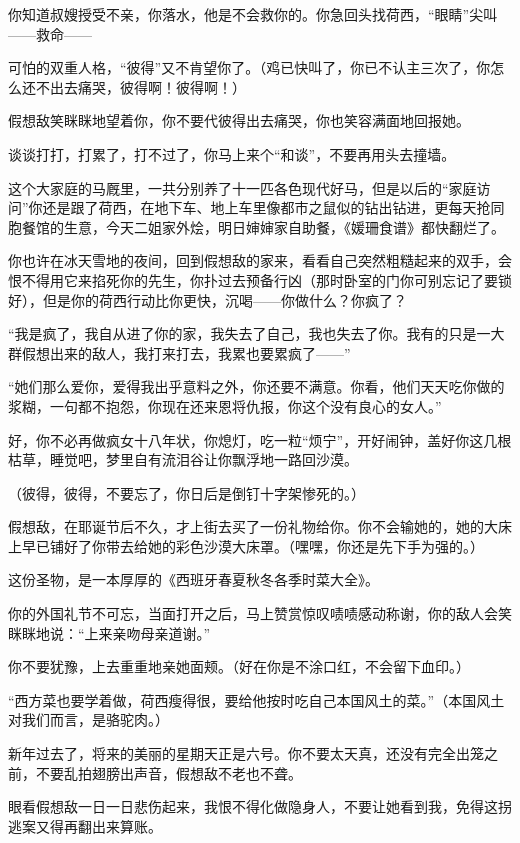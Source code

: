 \par 你知道叔嫂授受不亲，你落水，他是不会救你的。你急回头找荷西，“眼睛”尖叫——救命——
\par 可怕的双重人格，“彼得”又不肯望你了。（鸡已快叫了，你已不认主三次了，你怎么还不出去痛哭，彼得啊！彼得啊！）
\par 假想敌笑眯眯地望着你，你不要代彼得出去痛哭，你也笑容满面地回报她。
\par 谈谈打打，打累了，打不过了，你马上来个“和谈”，不要再用头去撞墙。
\par 这个大家庭的马厩里，一共分别养了十一匹各色现代好马，但是以后的“家庭访问”你还是跟了荷西，在地下车、地上车里像都市之鼠似的钻出钻进，更每天抢同胞餐馆的生意，今天二姐家外烩，明日婶婶家自助餐，《媛珊食谱》都快翻烂了。
\par 你也许在冰天雪地的夜间，回到假想敌的家来，看看自己突然粗糙起来的双手，会恨不得用它来掐死你的先生，你扑过去预备行凶（那时卧室的门你可别忘记了要锁好），但是你的荷西行动比你更快，沉喝——你做什么？你疯了？
\par “我是疯了，我自从进了你的家，我失去了自己，我也失去了你。我有的只是一大群假想出来的敌人，我打来打去，我累也要累疯了——”
\par “她们那么爱你，爱得我出乎意料之外，你还要不满意。你看，他们天天吃你做的浆糊，一句都不抱怨，你现在还来恩将仇报，你这个没有良心的女人。”
\par 好，你不必再做疯女十八年状，你熄灯，吃一粒“烦宁”，开好闹钟，盖好你这几根枯草，睡觉吧，梦里自有流泪谷让你飘浮地一路回沙漠。
\par （彼得，彼得，不要忘了，你日后是倒钉十字架惨死的。）
\par 假想敌，在耶诞节后不久，才上街去买了一份礼物给你。你不会输她的，她的大床上早已铺好了你带去给她的彩色沙漠大床罩。（嘿嘿，你还是先下手为强的。）
\par 这份圣物，是一本厚厚的《西班牙春夏秋冬各季时菜大全》。
\par 你的外国礼节不可忘，当面打开之后，马上赞赏惊叹啧啧感动称谢，你的敌人会笑眯眯地说：“上来亲吻母亲道谢。”
\par 你不要犹豫，上去重重地亲她面颊。（好在你是不涂口红，不会留下血印。）
\par “西方菜也要学着做，荷西瘦得很，要给他按时吃自己本国风土的菜。”（本国风土对我们而言，是骆驼肉。）
\par 新年过去了，将来的美丽的星期天正是六号。你不要太天真，还没有完全出笼之前，不要乱拍翅膀出声音，假想敌不老也不聋。
\par 眼看假想敌一日一日悲伤起来，我恨不得化做隐身人，不要让她看到我，免得这拐逃案又得再翻出来算账。
